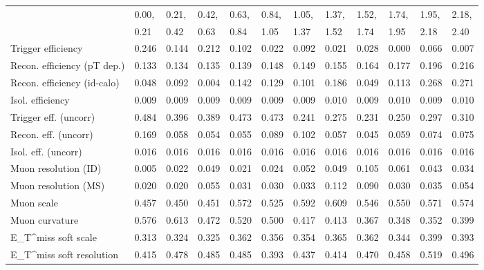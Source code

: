 \begin{tabular}{l|p{0.6cm}p{0.6cm}p{0.6cm}p{0.6cm}p{0.6cm}p{0.6cm}p{0.6cm}p{0.6cm}p{0.6cm}p{0.6cm}p{0.6cm}}
\hline
   & 0.00, & 0.21, & 0.42, & 0.63, & 0.84, & 1.05, & 1.37, & 1.52, & 1.74, & 1.95, & 2.18,  \\ 
   & 0.21 & 0.42 & 0.63 & 0.84 & 1.05 & 1.37 & 1.52 & 1.74 & 1.95 & 2.18 & 2.40  \\ 
\hline
Trigger efficiency                       & 0.246 & 0.144 & 0.212 & 0.102 & 0.022 & 0.092 & 0.021 & 0.028 & 0.000 & 0.066 & 0.007 \\
Recon. efficiency (pT dep.)              & 0.133 & 0.134 & 0.135 & 0.139 & 0.148 & 0.149 & 0.155 & 0.164 & 0.177 & 0.196 & 0.216 \\
Recon. efficiency (id-calo)              & 0.048 & 0.092 & 0.004 & 0.142 & 0.129 & 0.101 & 0.186 & 0.049 & 0.113 & 0.268 & 0.271 \\
Isol. efficiency                         & 0.009 & 0.009 & 0.009 & 0.009 & 0.009 & 0.009 & 0.010 & 0.009 & 0.010 & 0.009 & 0.010 \\
Trigger eff. (uncorr)                    & 0.484 & 0.396 & 0.389 & 0.473 & 0.473 & 0.241 & 0.275 & 0.231 & 0.250 & 0.297 & 0.310 \\
Recon. eff. (uncorr)                     & 0.169 & 0.058 & 0.054 & 0.055 & 0.089 & 0.102 & 0.057 & 0.045 & 0.059 & 0.074 & 0.075 \\
Isol. eff. (uncorr)                      & 0.016 & 0.016 & 0.016 & 0.016 & 0.016 & 0.016 & 0.016 & 0.016 & 0.016 & 0.016 & 0.016 \\
Muon resolution (ID)                     & 0.005 & 0.022 & 0.049 & 0.021 & 0.024 & 0.052 & 0.049 & 0.105 & 0.061 & 0.043 & 0.034 \\
Muon resolution (MS)                     & 0.020 & 0.020 & 0.055 & 0.031 & 0.030 & 0.033 & 0.112 & 0.090 & 0.030 & 0.035 & 0.054 \\
Muon scale                               & 0.457 & 0.450 & 0.451 & 0.572 & 0.525 & 0.592 & 0.609 & 0.546 & 0.550 & 0.571 & 0.574 \\
Muon curvature                           & 0.576 & 0.613 & 0.472 & 0.520 & 0.500 & 0.417 & 0.413 & 0.367 & 0.348 & 0.352 & 0.399 \\
E_{T}^{miss} soft scale                  & 0.313 & 0.324 & 0.325 & 0.362 & 0.356 & 0.354 & 0.365 & 0.362 & 0.344 & 0.399 & 0.393 \\
E_{T}^{miss} soft resolution             & 0.415 & 0.478 & 0.485 & 0.485 & 0.393 & 0.437 & 0.414 & 0.470 & 0.458 & 0.519 & 0.496 \\

\end{tabular}
